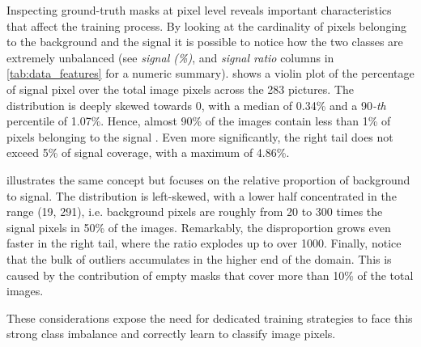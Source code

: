 Inspecting ground-truth masks at pixel level reveals important characteristics that affect the training process. 
By looking at the cardinality of pixels belonging to the background and the signal it is possible to notice how the two classes are extremely unbalanced (see \textit{signal (\%)}, and \textit{signal ratio} columns in \cref{tab:data_features} for a numeric summary).
 shows a violin plot of the percentage of signal pixel over the total image pixels across the 283 pictures.
The distribution is deeply skewed towards 0, with a median of 0.34\% and a 90\emph{-th} percentile of 1.07\%. 
Hence, almost 90\% of the images contain less than 1\% of pixels belonging to the signal%
.
Even more significantly, the right tail does not exceed 5\% of signal coverage, with a maximum of 4.86\%.

 illustrates the same concept but focuses on the relative proportion of background to signal. 
The distribution is left-skewed, with a lower half concentrated in the range (19, 291), i.e. background pixels are roughly from 20 to 300 times the signal pixels in 50\% of the images.
Remarkably, the disproportion grows even faster in the right tail, where the ratio explodes up to over 1000. 
Finally, notice that the bulk of outliers accumulates in the higher end of the domain. 
This is caused by the contribution of empty masks that cover more than 10\% of the total images.

These considerations expose the need for dedicated training strategies to face this strong class imbalance and correctly learn to classify image pixels.

